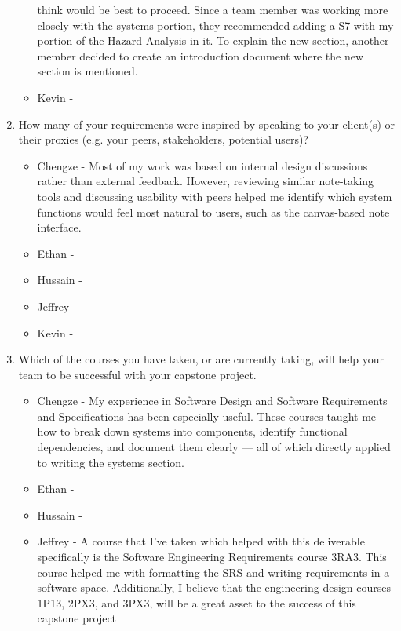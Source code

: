 \begin{enumerate}
\begin{itemize}
        think would be best to proceed. Since a team member was working more 
        closely with the systems portion, they recommended adding a S7 with my
        portion of the Hazard Analysis in it. To explain the new section,
        another member decided to create an introduction document where the
        new section is mentioned. 
        \item Kevin - 
  \end{itemize} 
  \item How many of your requirements were inspired by speaking to your
  client(s) or their proxies (e.g. your peers, stakeholders, potential users)?
  \begin{itemize}
        \item Chengze - Most of my work was based on internal design discussions 
        rather than external feedback. However, reviewing similar note-taking tools 
        and discussing usability with peers helped me identify which system functions 
        would feel most natural to users, such as the canvas-based note interface.
        \item Ethan - 
        \item Hussain - 
        \item Jeffrey - 
        \item Kevin - 
  \end{itemize} 
  \item Which of the courses you have taken, or are currently taking, will help
  your team to be successful with your capstone project.
  \begin{itemize}
        \item Chengze - My experience in Software Design and Software Requirements 
        and Specifications has been especially useful. These courses taught me how 
        to break down systems into components, identify functional dependencies, and 
        document them clearly — all of which directly applied to writing the systems section.
        \item Ethan - 
        \item Hussain - 
        \item Jeffrey - A course that I've taken which helped with this deliverable
        specifically is the Software Engineering Requirements course 3RA3. This course
        helped me with formatting the SRS and writing requirements in a software space.
        Additionally, I believe that the engineering design courses 1P13, 2PX3, 
        and 3PX3, will be a great asset to the success of this capstone project 

\end{itemize}
\end{enumerate}
